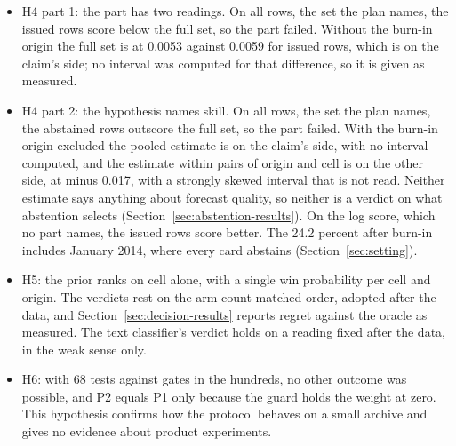 \begin{itemize}
\item H4 part 1: the part has two readings. On all rows, the set the plan names, the issued rows score below the full set, so the part failed. Without the burn-in origin the full set is at 0.0053 against 0.0059 for issued rows, which is on the claim's side; no interval was computed for that difference, so it is given as measured.
\item H4 part 2: the hypothesis names skill. On all rows, the set the plan names, the abstained rows outscore the full set, so the part failed. With the burn-in origin excluded the pooled estimate is on the claim's side, with no interval computed, and the estimate within pairs of origin and cell is on the other side, at minus 0.017, with a strongly skewed interval that is not read. Neither estimate says anything about forecast quality, so neither is a verdict on what abstention selects (Section~\ref{sec:abstention-results}). On the log score, which no part names, the issued rows score better. The 24.2 percent after burn-in includes January 2014, where every card abstains (Section~\ref{sec:setting}).
\item H5: the prior ranks on cell alone, with a single win probability per cell and origin. The verdicts rest on the arm-count-matched order, adopted after the data, and Section~\ref{sec:decision-results} reports regret against the oracle as measured. The text classifier's verdict holds on a reading fixed after the data, in the weak sense only.
\item H6: with 68 tests against gates in the hundreds, no other outcome was possible, and P2 equals P1 only because the guard holds the weight at zero. This hypothesis confirms how the protocol behaves on a small archive and gives no evidence about product experiments.
\end{itemize}

